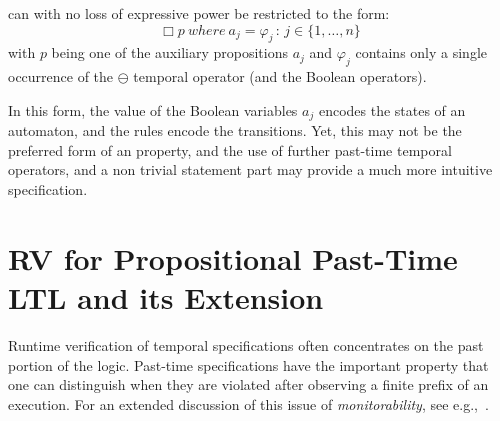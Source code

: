 \begin{lemma}
\EPLTL{} can with no loss of expressive power be restricted to the form:
\[  \Box p {\ where\ } a_j  = \varphi_j \, : \, 
{j \in \{1, \ldots , n\}}  \] 
with $p$ being one of the auxiliary propositions $a_j$
and $\varphi_j$ contains only a single
occurrence of the $\ominus$ temporal operator (and the Boolean operators). 
\end{lemma}
In this form, the value of the Boolean variables $a_j$ encodes the states of an automaton, and the rules encode the transitions.
%
Yet, this may not be the preferred form
of an \EPLTL{} property, and the use of further past-time temporal operators, and a non trivial statement  part may provide a much more intuitive specification.
%

\section{RV for Propositional Past-Time LTL and its Extension}
\label{LTLruntime}

Runtime verification of temporal specifications often
concentrates on the past portion of the logic.  Past-time  specifications have the important property that one can distinguish when they are violated after observing a finite prefix of
an execution. For an extended discussion of this issue of {\em monitorability}, see e.g.,~\cite{Ugly,FFM}.

